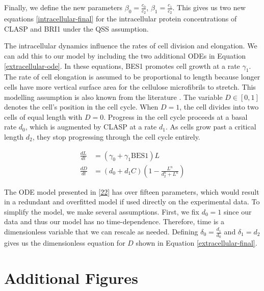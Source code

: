 \documentclass[referee,pdflatex,sn-mathphys-num]{sn-jnl}
\begin{document}
\begin{appendices}
Finally, we define the new parameters $\beta_{0} = \frac{c_{0}}{c_{2}}$, $\beta_{1} = \frac{c_{1}}{c_{2}}$. This gives us two new equations \eqref{intracellular-final} for the intracellular protein concentrations of CLASP and BRI1 under the QSS assumption.

The intracellular dynamics influence the rates of cell division and elongation. We can add this to our model by including the two additional ODEs in Equation \eqref{extracellular-ode}. In these equations, BES1 promotes cell growth at a rate $\gamma_{1}$. The rate of cell elongation is assumed to be proportional to length because longer cells have more vertical surface area for the cellulose microfibrils to stretch. This modelling assumption is also known from the literature \cite{lockhart1965, smithers2024}. The variable $D \in [0, 1]$ denotes the cell's position in the cell cycle. When $D = 1$, the cell divides into two cells of equal length with $D = 0$. Progress in the cell cycle proceeds at a basal rate $d_{0}$, which is augmented by CLASP at a rate $d_{1}$. As cells grow past a critical length $d_{2}$, they stop progressing through the cell cycle entirely. 

\begin{equation}
\label{extracellular-ode}
\begin{aligned}
  \frac{ dL }{ dt } &= \left(\gamma_{0} + \gamma_{1}\text{BES1}\right)L  \\[5pt]
\frac{ dD }{ dt } &= (d_{0} + d_{1}C)\left( 1 - \frac{ L^{ n } }{ d_{2}^{ n } + L^{ n } } \right) 
\end{aligned}
\end{equation}

The ODE model presented in \ref{22} has over fifteen parameters, which would result in a redundant and overfitted model if used directly on the experimental data. To simplify the model, we make several assumptions. First, we fix $d_{0} = 1$ since our data and thus our model has no time-dependence. Therefore, time is a dimensionless variable that we can rescale as needed. Defining $\delta_{0} = \frac{d_{1}}{d_{0}}$ and $\delta_{1} = d_{2}$ gives us the dimensionless equation for $D$ shown in Equation \eqref{extracellular-final}.

\section{Additional Figures}\label{secA3}


\end{appendices}
\end{document}
